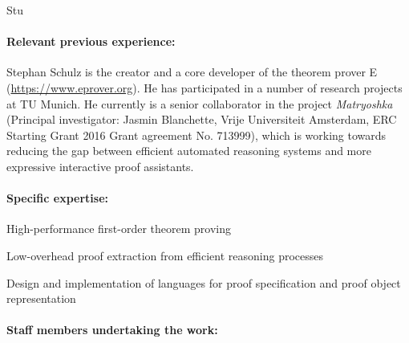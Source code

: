 \begin{sitedescription}{Stu}
\begin{compactitem}
\item
\end{compactitem}


\paragraph{Relevant previous experience:}

Stephan Schulz is the creator and a core developer of the theorem
prover E (\url{https://www.eprover.org}).  He has participated in a
number of research projects at TU Munich. He currently is a senior
collaborator in the project \emph{Matryoshka} (Principal investigator:
Jasmin Blanchette, Vrije Universiteit Amsterdam, ERC Starting Grant
2016 Grant agreement No. 713999), which is working towards reducing
the gap between efficient automated reasoning systems and more
expressive interactive proof assistants.
  
\paragraph{Specific expertise:}

\begin{compactitem}
\item High-performance first-order theorem proving
\item Low-overhead proof extraction from efficient reasoning processes
\item Design and implementation of languages for proof specification
  and proof object representation
\end{compactitem}

\paragraph{Staff members undertaking the work:}



\end{sitedescription}
